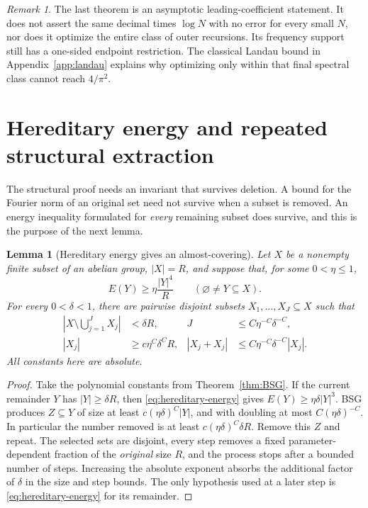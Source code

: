 \documentclass[11pt,reqno]{amsart}
\numberwithin{equation}{section}
\newtheorem{lemma}[theorem]{Lemma}
\theoremstyle{definition}
\theoremstyle{remark}
\newtheorem{remark}[theorem]{Remark}
\begin{document}
\begin{remark}
The last theorem is an asymptotic leading-coefficient statement. It does
not assert the same decimal times $\log N$ with no error for every small
$N$, nor does it optimize the entire class of outer recursions. Its
frequency support still has a one-sided endpoint restriction. The
classical Landau bound in Appendix~\ref{app:landau} explains why
optimizing only within that final spectral class cannot reach $4/\pi^2$.
\end{remark}

\section{Hereditary energy and repeated structural extraction}\label{sec:hered}

The structural proof needs an invariant that survives deletion. A
bound for the Fourier norm of an original set need not survive when a
subset is removed. An energy inequality formulated for \emph{every}
remaining subset does survive, and this is the purpose of the next
lemma.

\begin{lemma}[Hereditary energy gives an almost-covering]\label{lem:peeling}
Let $X$ be a nonempty finite subset of an abelian group, $|X|=R$, and
suppose that, for some $0<\eta\le1$,
\begin{equation}\label{eq:hereditary-energy}
 E(Y)\ge\eta\frac{|Y|^4}{R}
 \qquad(\varnothing\ne Y\subseteq X).
\end{equation}
For every $0<\delta<1$, there are pairwise disjoint subsets
$X_1,\ldots,X_J\subseteq X$ such that
\begin{align}
 \left|X\setminus\bigcup_{j=1}^JX_j\right|&<\delta R,
 &J&\le C\eta^{-C}\delta^{-C},\label{eq:peeling-cover}\\
 |X_j|&\ge c\eta^C\delta^C R,
 &|X_j+X_j|&\le C\eta^{-C}\delta^{-C}|X_j|.
 \label{eq:peeling-size}
\end{align}
All constants here are absolute.
\end{lemma}
\begin{proof}
Take the polynomial constants from Theorem~\ref{thm:BSG}. If the current
remainder $Y$ has $|Y|\ge\delta R$, then
\eqref{eq:hereditary-energy} gives
$E(Y)\ge\eta\delta|Y|^3$. BSG produces $Z\subseteq Y$ of size at least
$c(\eta\delta)^C|Y|$, and with doubling at most
$C(\eta\delta)^{-C}$. In particular the number removed is at least
$c(\eta\delta)^C\delta R$. Remove this $Z$ and repeat. The selected sets
are disjoint, every step removes a fixed parameter-dependent fraction
of the \emph{original} size $R$, and the process stops after a bounded
number of steps. Increasing the absolute exponent absorbs the additional
factor of $\delta$ in the size and step bounds. The only hypothesis
used at a later step is \eqref{eq:hereditary-energy} for its remainder.
\end{proof}
\end{document}
